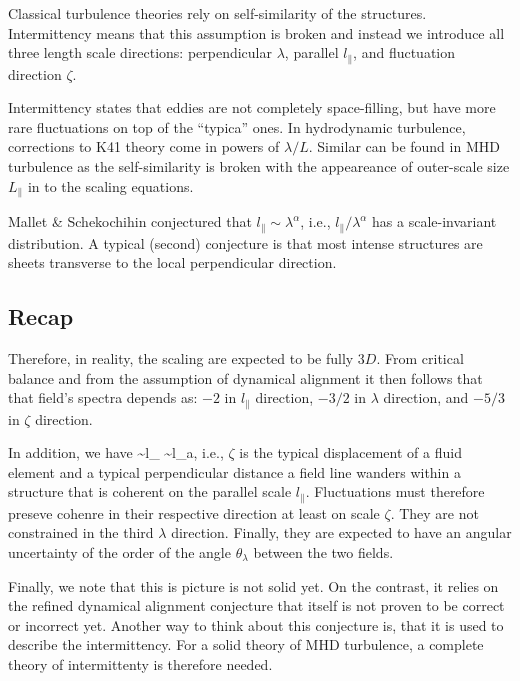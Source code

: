 \documentclass[usenatbib,twocolumn]{aastex63}
\begin{document}
Classical turbulence theories rely on self-similarity of the structures. 
Intermittency means that this assumption is broken and instead we introduce all three length scale directions: 
perpendicular $\lambda$, parallel $l_\parallel$, and fluctuation direction $\zeta$.

Intermittency states that eddies are not completely space-filling, but have more rare fluctuations on top of the ``typica'' ones.
In hydrodynamic turbulence, corrections to K41 theory come in powers of $\lambda/L$.
Similar can be found in MHD turbulence as the self-similarity is broken with the appeareance of outer-scale size $L_\parallel$ in to the scaling equations.

Mallet \& Schekochihin conjectured that $l_\parallel \sim \lambda^\alpha$, i.e., $l_\parallel/\lambda^\alpha$ has a scale-invariant distribution.
A typical (second) conjecture is that most intense structures are sheets transverse to the local perpendicular direction.


\subsection{Recap}

Therefore, in reality, the scaling are expected to be fully $3D$.
From critical balance and from the assumption of dynamical alignment it then follows that that field's spectra depends as:
$-2$ in $l_\parallel$ direction,
$-3/2$ in $\lambda$ direction, and
$-5/3$ in $\zeta$ direction.

In addition, we have
\be
\zeta \sim l_\parallel {} \sim l_\parallel {}a,
\ee
i.e., $\zeta$ is the typical displacement of a fluid element and a typical perpendicular distance a field line wanders within a structure that is coherent on the parallel scale $l_\parallel$.
Fluctuations must therefore preseve cohenre in their respective direction at least on scale $\zeta$.
They are not constrained in the third $\lambda$ direction.
Finally, they are expected to have an angular uncertainty of the order of the angle $\theta_\lambda$ between the two fields.

Finally, we note that this is picture is not solid yet.
On the contrast, it relies on the refined dynamical alignment conjecture that itself is not proven to be correct or incorrect yet.
Another way to think about this conjecture is, that it is used to describe the intermittency.
For a solid theory of MHD turbulence, a complete theory of intermittenty is therefore needed.
\end{document}
